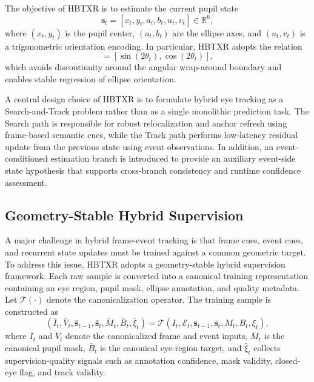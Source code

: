 ﻿\documentclass[journal]{IEEEtran}
\begin{document}
The objective of HBTXR is to estimate the current pupil state
\begin{equation}
\mathbf{s}_t = [x_t, y_t, a_t, b_t, u_t, v_t] \in \mathbb{R}^{6},
\label{eq:state_def}
\end{equation}
where \((x_t,y_t)\) is the pupil center, \((a_t,b_t)\) are the ellipse axes, and \((u_t,v_t)\) is a trigonometric orientation encoding. In particular, HBTXR adopts the relation
\begin{equation}
[u_t, v_t] = [\sin(2\theta_t), \cos(2\theta_t)],
\label{eq:uv_def}
\end{equation}
which avoids discontinuity around the angular wrap-around boundary and enables stable regression of ellipse orientation.

A central design choice of HBTXR is to formulate hybrid eye tracking as a Search-and-Track problem rather than as a single monolithic prediction task. The Search path is responsible for robust relocalization and anchor refresh using frame-based semantic cues, while the Track path performs low-latency residual update from the previous state using event observations. In addition, an event-conditioned estimation branch is introduced to provide an auxiliary event-side state hypothesis that supports cross-branch consistency and runtime confidence assessment.

\subsection{Geometry-Stable Hybrid Supervision}

A major challenge in hybrid frame-event tracking is that frame cues, event cues, and recurrent state updates must be trained against a common geometric target. To address this issue, HBTXR adopts a geometry-stable hybrid supervision framework. Each raw sample is converted into a canonical training representation containing an eye region, pupil mask, ellipse annotation, and quality metadata. Let \(\mathcal{T}(\cdot)\) denote the canonicalization operator. The training sample is constructed as
\begin{equation}
(\bar{I}_t, \bar{V}_t, \bar{\mathbf{s}}_{t-1}, \bar{\mathbf{s}}_t, \bar{M}_t, \bar{B}_t, \bar{\xi}_t)
=
\mathcal{T}(I_t, \mathcal{E}_t, \mathbf{s}_{t-1}, \mathbf{s}_t, M_t, B_t, \xi_t),
\label{eq:canonical_contract}
\end{equation}
where \(\bar{I}_t\) and \(\bar{V}_t\) denote the canonicalized frame and event inputs, \(\bar{M}_t\) is the canonical pupil mask, \(\bar{B}_t\) is the canonical eye-region target, and \(\bar{\xi}_t\) collects supervision-quality signals such as annotation confidence, mask validity, closed-eye flag, and track validity.
\end{document}
